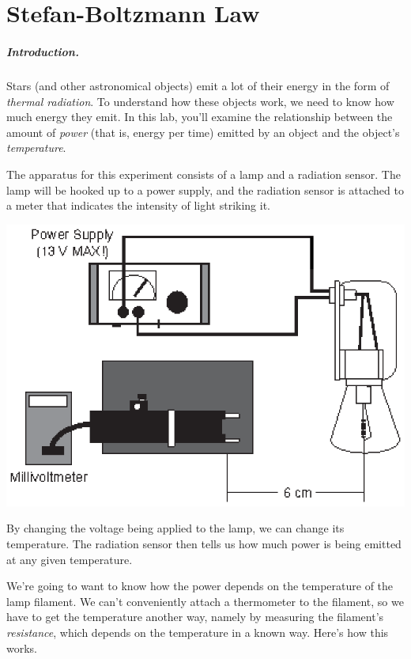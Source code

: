 \chapter{Stefan-Boltzmann Law}

\paragraph{Introduction.}
Stars (and other astronomical objects) emit a lot of their energy
in the form of \textit{thermal radiation}. To understand how these objects
work, we need to know how much energy they emit. In this lab, you'll
examine the relationship between the amount of \textit{power} (that is,
energy per time) emitted
by an object and the object's \textit{temperature}.

The apparatus for this experiment consists of a lamp and a radiation sensor.
The lamp will be  hooked up to a power supply, and the radiation sensor
is attached to a meter that indicates the intensity of light
striking it.

\centerline{\includegraphics{figs/stefan1.eps}}

By changing the voltage being applied to the lamp, we can change its
temperature. The radiation sensor then tells us how much power is being
emitted at any given temperature.

We're going to want to know how the power depends on the temperature of the
lamp filament. We can't conveniently attach a thermometer to the filament,
so we have to get the temperature another way, namely by measuring
the filament's \textit{resistance}, which depends on the temperature
in a known way. Here's how this works.


